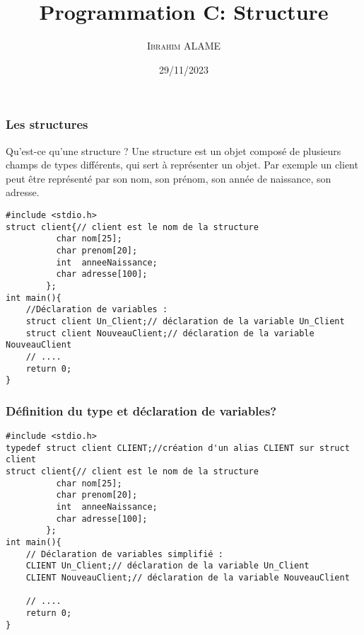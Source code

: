 \documentclass{beamer}
\title{Programmation C: Structure}
\author{ \textsc{Ibrahim ALAME}}\institute{ESIEE}
\date{29/11/2023}
\begin{document}
\maketitle
  

\begin{frame}[fragile]
\frametitle{Les structures}
\begin{block}{Qu'est-ce qu'une structure ?}
Une structure est un objet composé de plusieurs champs de types différents, qui sert à représenter un objet. Par exemple un client peut être représenté par son nom, son prénom, son année de naissance, son adresse.
\end{block}
\begin{verbatim}  
#include <stdio.h>
struct client{// client est le nom de la structure
    	  char nom[25];
    	  char prenom[20];
    	  int  anneeNaissance;
    	  char adresse[100];
        };
int main(){ 
    //Déclaration de variables :
	struct client Un_Client;// déclaration de la variable Un_Client
	struct client NouveauClient;// déclaration de la variable NouveauClient
    // ....
    return 0; 
}
\end{verbatim}
\end{frame}
  
  
\begin{frame}[fragile]
\frametitle{Définition du type et déclaration de variables?}

\begin{verbatim}  
#include <stdio.h>
typedef struct client CLIENT;//création d'un alias CLIENT sur struct client
struct client{// client est le nom de la structure
    	  char nom[25];
    	  char prenom[20];
    	  int  anneeNaissance;
    	  char adresse[100];
        };
int main(){ 
    // Déclaration de variables simplifié :
    CLIENT Un_Client;// déclaration de la variable Un_Client
    CLIENT NouveauClient;// déclaration de la variable NouveauClient

    // ....
    return 0; 
}
\end{verbatim}
\end{frame}
  
\end{document}
